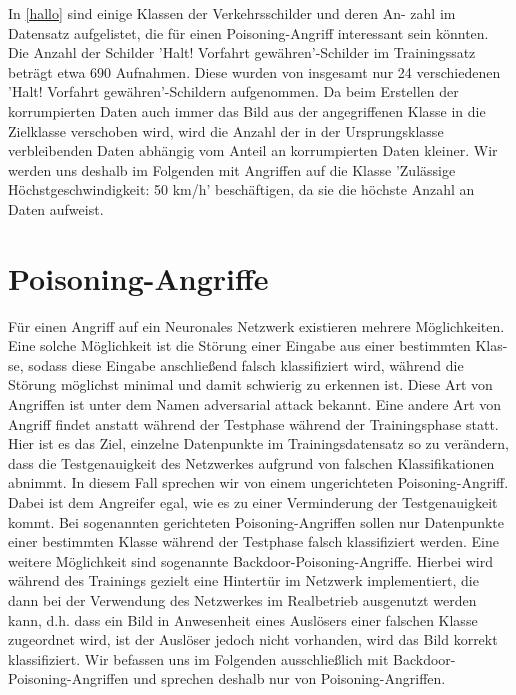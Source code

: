 \documentclass[11pt,a4paper]{article}
\numberwithin{equation}{section}
\begin{document}
	
	
	
	
	
	
	
	In \autoref{hallo} sind einige Klassen der Verkehrsschilder und deren An-
	zahl im Datensatz aufgelistet, die für einen Poisoning-Angriff interessant sein
	könnten. Die Anzahl der Schilder ’Halt! Vorfahrt gewähren’-Schilder im Trainingssatz beträgt etwa 690 Aufnahmen. Diese wurden von insgesamt nur 24 verschiedenen ’Halt! Vorfahrt gewähren’-Schildern aufgenommen. Da beim Erstellen der korrumpierten Daten auch immer das Bild aus der angegriffenen Klasse
	in die Zielklasse verschoben wird, wird die Anzahl der in der Ursprungsklasse verbleibenden Daten abhängig vom Anteil an korrumpierten Daten kleiner.
	Wir werden uns deshalb im Folgenden mit Angriffen auf die Klasse ’Zulässige
	Höchstgeschwindigkeit: 50 km/h’ beschäftigen, da sie die höchste Anzahl an
	Daten aufweist.
	
	
	\section{Poisoning-Angriffe} \label{chapter_poisoningattacks}
	Für einen Angriff auf ein Neuronales Netzwerk existieren mehrere Möglichkeiten.
	Eine solche Möglichkeit ist die Störung einer Eingabe aus einer bestimmten Klas-
	se, sodass diese Eingabe anschließend falsch klassifiziert wird, während die Störung
	möglichst minimal und damit schwierig zu erkennen ist. Diese Art von Angriffen ist
	unter dem Namen adversarial attack bekannt. Eine andere Art von Angriff findet anstatt während der Testphase während der Trainingsphase statt.
	Hier ist es das Ziel, einzelne Datenpunkte im Trainingsdatensatz so zu verändern, dass die Testgenauigkeit
	des Netzwerkes aufgrund von falschen Klassifikationen abnimmt. In diesem Fall
	sprechen wir von einem ungerichteten Poisoning-Angriff. Dabei ist dem Angreifer
	egal, wie es zu einer Verminderung der Testgenauigkeit kommt. Bei sogenannten
	gerichteten Poisoning-Angriffen sollen nur Datenpunkte einer bestimmten Klasse
	während der Testphase falsch klassifiziert werden.
	Eine weitere Möglichkeit sind sogenannte Backdoor-Poisoning-Angriffe. Hierbei
	wird während des Trainings gezielt eine Hintertür im Netzwerk implementiert, die
	dann bei der Verwendung des Netzwerkes im Realbetrieb ausgenutzt werden kann,
	d.h. dass ein Bild in Anwesenheit eines Auslösers einer falschen Klasse zugeordnet
	wird, ist der Auslöser jedoch nicht vorhanden, wird das Bild korrekt klassifiziert.
	Wir befassen uns im Folgenden ausschließlich mit Backdoor-Poisoning-Angriffen
	und sprechen deshalb nur von Poisoning-Angriffen.\\
	
\end{document}
